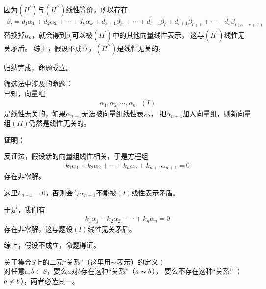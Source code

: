 \documentclass{article}
\begin{document}
\begin{itemize}
        因为$(II^\prime)$与$(II^{\prime\prime})$线性等价，所以存在
        \begin{align*}
          \beta_{l} = d_1 \alpha_1 + d_2 \alpha_2 + \cdots + d_k \alpha_k
          + d_{k + 1} \beta_{i1} + \cdots + d_{l - 1} \beta_{l}
          + d_{l + 1} \beta_{l+1} + \cdots
          + d_s \beta_{i(s - r + 1)}
        \end{align*}
        替换掉$\alpha_k$，就会得到$\beta_{l}$可以被$(II^\prime)$中的其他向量线性表示，
        这与$(II^\prime)$线性无关矛盾。
        综上，假设不成立，$(II^{\prime\prime})$是线性无关的。

        归纳完成，命题成立。
\end{itemize}

\begin{zremark}
  筛选法中涉及的命题：\\

  已知，向量组
  \begin{align*}
    \alpha_1, \alpha_2, \cdots, \alpha_n \ \ \ (I)
  \end{align*}
  是线性无关的，如果$\alpha_{n + 1}$无法被向量组线性表示，
  把$\alpha_{n + 1}$加入向量组，则新向量组$(II)$仍然是线性无关的。
\end{zremark}

\textbf{证明：}

反证法，假设新的向量组线性相关，于是方程组
\begin{align*}
  k_1 \alpha_1 + k_2 \alpha_2 + \cdots + k_n \alpha_n + k_{n + 1} \alpha_{n + 1} = 0
\end{align*}
存在非零解。

这里$k_{n + 1} = 0$，否则会与$\alpha_{n + 1}$不能被$(I)$线性表示矛盾。

于是，我们有
\begin{align*}
  k_1 \alpha_1 + k_2 \alpha_2 + \cdots + k_n \alpha_n = 0
\end{align*}
存在非零解，这与题设$(I)$线性无关矛盾。

综上，假设不成立，命题得证。

\begin{zremark}
  关于集合$S$上的二元“关系”（这里用$\thicksim$表示）的定义：\\
  对任意$a, b \in S$，要么$a$对$b$存在这种“关系”（$a \thicksim b$），
  要么不存在这种“关系”（$a \not\thicksim b$），两者必选其一。
\end{zremark}
\end{document}
